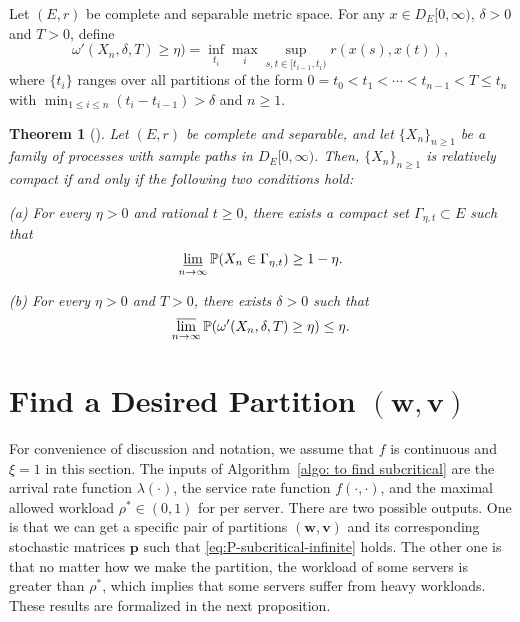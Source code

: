 \documentclass[11pt, reqno]{article}
\newtheorem{theorem}{Theorem}
\numberwithin{equation}{section}
\numberwithin{theorem}{section}
\newcommand{\PP}{\mathbb{P}}  				%
\begin{document}
\noindent
Let $(E,r)$ be complete and separable metric space. For any $x\in D_E[0,\infty)$, $\delta>0$ and $T>0$, define 
$$\omega'(X_n,\delta,T)\geq \eta)=\inf_{t_i}\max_{i}\sup_{s,t\in [t_{i-1},t_i)}r(x(s),x(t)),$$ 
where $\{t_i\}$ ranges over all partitions of the form $0=t_0<t_1<\cdots<t_{n-1}<T\leq t_n$ with $\min_{1\leq i\leq n}(t_i-t_{i-1})>\delta$ and $n\geq1$.

\begin{theorem}[{\cite[Theorem~7.2]{EK09}}]\label{thm: relative-compact}
Let $(E,r)$ be complete and separable, and let $\{X_n\}_{n\geq1}$ be a family of processes with sample paths in $D_E[0,\infty)$. Then, $\{X_n\}_{n\geq1}$ is relatively compact if and only if the following two conditions hold: 

(a) For every $\eta>0$ and rational $t\geq0$, there exists a compact set $\Gamma_{\eta,t}\subset E$ such that
\begin{equation}\label{eq:cond-a}
    \varliminf_{n\rightarrow\infty}\PP(X_n\in \Gamma_{\eta,t})\geq 1-\eta.
\end{equation}

(b) For every $\eta>0$ and $T>0$, there exists $\delta>0$ such that
\begin{equation}\label{eq:cond-b}
    \varlimsup_{n\rightarrow\infty} \PP(\omega'(X_n,\delta,T)\geq \eta)\leq \eta.
\end{equation}


\end{theorem}

\section{Find a Desired Partition $(\mathbf{w},\mathbf{v})$}\label{sec:find-wvp-subcritical}
For convenience of discussion and notation, we assume that $f$ is continuous and $\xi=1$ in this section.
The inputs of Algorithm~\ref{algo: to find subcritical} are the arrival rate function $\lambda(\cdot)$, the service rate function $f(\cdot,\cdot)$, and the maximal allowed workload $\rho^*\in(0,1)$ for per server. There are two possible outputs. One is that we can get a specific pair of partitions $(\mathbf{w},\mathbf{v})$ and its corresponding stochastic matrices $\mathbf{p}$ such that \eqref{eq:P-subcritical-infinite} holds. The other one is that no matter how we make the partition, the workload of some servers is greater than $\rho^*$, which implies that some servers suffer from heavy workloads. These results are formalized in the next proposition. 
\end{document}
